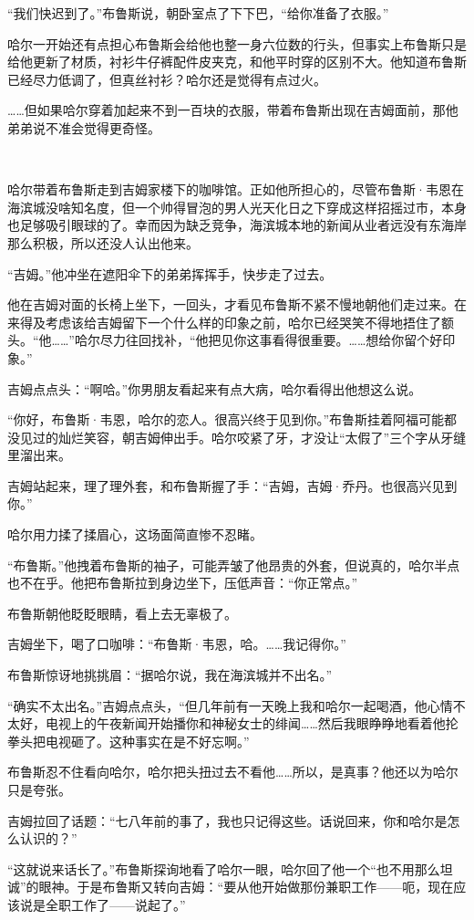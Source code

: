 \documentclass[../main]{subfiles}
\begin{document}
“我们快迟到了。”布鲁斯说，朝卧室点了下下巴，“给你准备了衣服。”

哈尔一开始还有点担心布鲁斯会给他也整一身六位数的行头，但事实上布鲁斯只是给他更新了材质，衬衫牛仔裤配件皮夹克，和他平时穿的区别不大。他知道布鲁斯已经尽力低调了，但真丝衬衫？哈尔还是觉得有点过火。

……但如果哈尔穿着加起来不到一百块的衣服，带着布鲁斯出现在吉姆面前，那他弟弟说不准会觉得更奇怪。

~\

哈尔带着布鲁斯走到吉姆家楼下的咖啡馆。正如他所担心的，尽管布鲁斯·韦恩在海滨城没啥知名度，但一个帅得冒泡的男人光天化日之下穿成这样招摇过市，本身也足够吸引眼球的了。幸而因为缺乏竞争，海滨城本地的新闻从业者远没有东海岸那么积极，所以还没人认出他来。

“吉姆。”他冲坐在遮阳伞下的弟弟挥挥手，快步走了过去。

他在吉姆对面的长椅上坐下，一回头，才看见布鲁斯不紧不慢地朝他们走过来。在来得及考虑该给吉姆留下一个什么样的印象之前，哈尔已经哭笑不得地捂住了额头。“他……”哈尔尽力往回找补，“他把见你这事看得很重要。……想给你留个好印象。”

吉姆点点头：“啊哈。”你男朋友看起来有点大病，哈尔看得出他想这么说。

“你好，布鲁斯·韦恩，哈尔的恋人。很高兴终于见到你。”布鲁斯挂着阿福可能都没见过的灿烂笑容，朝吉姆伸出手。哈尔咬紧了牙，才没让“太假了”三个字从牙缝里溜出来。

吉姆站起来，理了理外套，和布鲁斯握了手：“吉姆，吉姆·乔丹。也很高兴见到你。”

哈尔用力揉了揉眉心，这场面简直惨不忍睹。

“布鲁斯。”他拽着布鲁斯的袖子，可能弄皱了他昂贵的外套，但说真的，哈尔半点也不在乎。他把布鲁斯拉到身边坐下，压低声音：“你正常点。”

布鲁斯朝他眨眨眼睛，看上去无辜极了。

吉姆坐下，喝了口咖啡：“布鲁斯·韦恩，哈。……我记得你。”

布鲁斯惊讶地挑挑眉：“据哈尔说，我在海滨城并不出名。”

“确实不太出名。”吉姆点点头，“但几年前有一天晚上我和哈尔一起喝酒，他心情不太好，电视上的午夜新闻开始播你和神秘女士的绯闻……然后我眼睁睁地看着他抡拳头把电视砸了。这种事实在是不好忘啊。”

布鲁斯忍不住看向哈尔，哈尔把头扭过去不看他……所以，是真事？他还以为哈尔只是夸张。

吉姆拉回了话题：“七八年前的事了，我也只记得这些。话说回来，你和哈尔是怎么认识的？”

“这就说来话长了。”布鲁斯探询地看了哈尔一眼，哈尔回了他一个“也不用那么坦诚”的眼神。于是布鲁斯又转向吉姆：“要从他开始做那份兼职工作——呃，现在应该说是全职工作了——说起了。”
\end{document}
